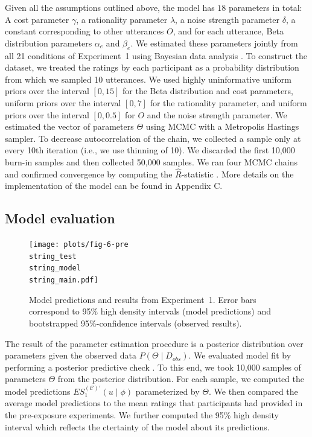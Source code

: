 Given all the assumptions outlined above, the model has  $18$ parameters in total: A cost parameter $\gamma$, a rationality parameter $\lambda$, a noise strength parameter $\delta$, a constant corresponding to other utterances $O$, and for each utterance, Beta distribution parameters $\alpha_e$ and $\beta_e$. We estimated these parameters jointly from all 21 conditions of Experiment~1 using Bayesian data analysis \cite[BDA; see, e.g.,][]{Kruschke2015}. To construct the dataset, we treated the ratings by each participant as a probability distribution from which we sampled 10 utterances. We used highly uninformative
uniform priors over the interval $[0,15]$ for the Beta distribution and cost parameters, uniform priors over the interval $[0,7]$ for the rationality parameter, and uniform priors over the interval $[0,0.5]$ for $O$ and the noise strength parameter. We estimated the vector of parameters $\Theta$ using MCMC with a Metropolis Hastings sampler. To decrease autocorrelation of the chain, we collected a sample only at every 10th iteration (i.e., we use thinning of 10). We discarded the first 10,000 burn-in samples and then collected 50,000 samples.  We ran four MCMC chains and confirmed convergence by computing the $\hat{R}$-statistic \cite{Gelman2003}. More details on the implementation of the model can be found in Appendix C.

\subsection{Model evaluation}

\begin{figure}[th!]
\texttt{[image: plots/fig-6-pre\\string\_test\\string\_model\\string\_main.pdf]}
\caption{Model predictions and results from Experiment~1. Error bars correspond to 95\% high density intervals (model predictions) and bootstrapped 95\%-confidence intervals (observed results). \label{fig:norming-results-model-main}}
\end{figure}


The result of the parameter estimation procedure is a posterior distribution over parameters given the observed data $P(\Theta \mid D_{obs})$. We evaluated
 model fit by performing a posterior predictive check \cite[PPC;][]{Kruschke2015}. To this end, we took 10,000 samples of parameters $\Theta$ from the posterior distribution. For each sample, we computed the model predictions $ES_1^{(\mathscr{C})'}(u \mid \phi)$ parameterized by $\Theta$. We then compared the average model predictions to the
mean ratings that participants had provided in the pre-exposure experiments. We further computed the 95\% high density interval  \cite[HDI;][]{Kruschke2015} which reflects the ctertainty of the model
about its predictions.

